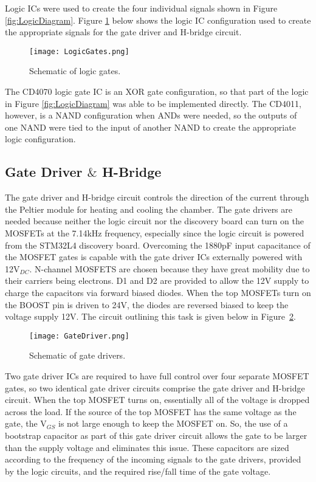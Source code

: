 \documentclass[11pt,letter]{article}
\begin{document}
Logic ICs were used to create the four individual signals shown in Figure \ref{fig:LogicDiagram}. Figure \ref{fig:logic} below shows the logic IC configuration used to create the appropriate signals for the gate driver and H-bridge circuit.

\begin{figure}[H]
    \centering
    \texttt{[image: LogicGates.png]}
    \caption{Schematic of logic gates.}
    \label{fig:logic}
\end{figure}

The CD4070 logic gate IC is an XOR gate configuration, so that part of the logic in Figure \ref{fig:LogicDiagram} was able to be implemented directly. The CD4011, however, is a NAND configuration when ANDs were needed, so the outputs of one NAND were tied to the input of another NAND to create the appropriate logic configuration.

\subsection{Gate Driver $\&$ H-Bridge}

The gate driver and H-bridge circuit controls the direction of the current through the Peltier module for heating and cooling the chamber. The gate drivers are needed because neither the logic circuit nor the discovery board can turn on the MOSFETs at the 7.14kHz frequency, especially since the logic circuit is powered from the STM32L4 discovery board. Overcoming the 1880pF input capacitance of the MOSFET gates is capable with the gate driver ICs externally powered with 12V$_{DC}$. N-channel MOSFETS are chosen because they have great mobility due to their carriers being electrons. D1 and D2 are provided to allow the 12V supply to charge the capacitors via forward biased diodes. When the top MOSFETs turn on the BOOST pin is driven to 24V, the diodes are reversed biased to keep the voltage supply 12V. The circuit outlining this task is given below in Figure~\ref{fig:gatedrivers}.

\begin{figure}[H]
    \centering
    \texttt{[image: GateDriver.png]}
    \caption{Schematic of gate drivers.}
    \label{fig:gatedrivers}
\end{figure}

Two gate driver ICs are required to have full control over four separate MOSFET gates, so two identical gate driver circuits comprise the gate driver and H-bridge circuit. When the top MOSFET turns on, essentially all of the voltage is dropped across the load. If the source of the top MOSFET has the same voltage as the gate, the V$_{GS}$ is not large enough to keep the MOSFET on. So, the use of a bootstrap capacitor as part of this gate driver circuit allows the gate to be larger than the supply voltage and eliminates this issue. These capacitors are sized according to the frequency of the incoming signals to the gate drivers, provided by the logic circuits, and the required rise/fall time of the gate voltage.
\end{document}
